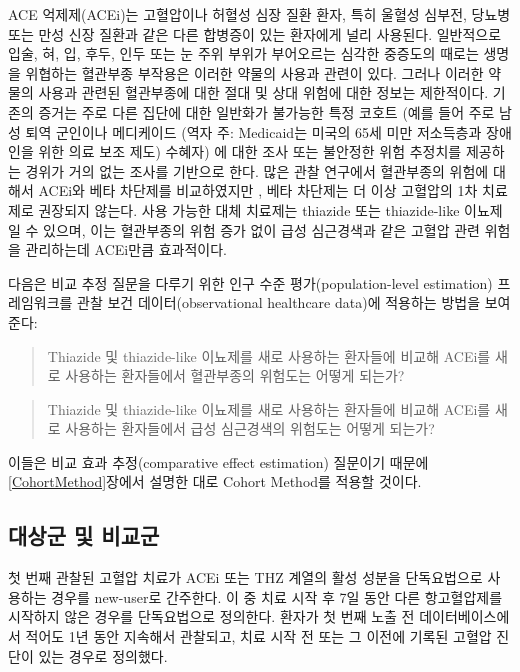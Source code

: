 \documentclass[11pt]{book}
\theoremstyle{definition}
\theoremstyle{definition}
\theoremstyle{definition}
\theoremstyle{remark}
\begin{document}
ACE 억제제(ACEi)는 고혈압이나 허혈성 심장 질환 환자, 특히 울혈성 심부전,
당뇨병 또는 만성 신장 질환과 같은 다른 합병증이 있는 환자에게 널리
사용된다. \citep{zaman_2002} 일반적으로 입술, 혀, 입, 후두, 인두 또는 눈
주위 부위가 부어오르는 심각한 중증도의 때로는 생명을 위협하는 혈관부종
부작용은 이러한 약물의 사용과 관련이 있다. \citep{sabroe_1997} 그러나
이러한 약물의 사용과 관련된 혈관부종에 대한 절대 및 상대 위험에 대한
정보는 제한적이다. 기존의 증거는 주로 다른 집단에 대한 일반화가 불가능한
특정 코호트 (예를 들어 주로 남성 퇴역 군인이나 메디케이드 (역자 주:
Medicaid는 미국의 65세 미만 저소득층과 장애인을 위한 의료 보조 제도)
수혜자) 에 대한 조사 또는 불안정한 위험 추정치를 제공하는 경위가 거의
없는 조사를 기반으로 한다. \citep{powers_2012} 많은 관찰 연구에서
혈관부종의 위험에 대해서 ACEi와 베타 차단제를 비교하였지만
\citep{magid_2010, toh_2012}, 베타 차단제는 더 이상 고혈압의 1차
치료제로 권장되지 않는다. \citep{whelton_2018} 사용 가능한 대체 치료제는
thiazide 또는 thiazide-like 이뇨제일 수 있으며, 이는 혈관부종의 위험
증가 없이 급성 심근경색과 같은 고혈압 관련 위험을 관리하는데 ACEi만큼
효과적이다.

다음은 비교 추정 질문을 다루기 위한 인구 수준 평가(population-level
estimation) 프레임워크를 관찰 보건 데이터(observational healthcare
data)에 적용하는 방법을 보여준다:

\begin{quote}
Thiazide 및 thiazide-like 이뇨제를 새로 사용하는 환자들에 비교해 ACEi를
새로 사용하는 환자들에서 혈관부종의 위험도는 어떻게 되는가?
\end{quote}

\begin{quote}
Thiazide 및 thiazide-like 이뇨제를 새로 사용하는 환자들에 비교해 ACEi를
새로 사용하는 환자들에서 급성 심근경색의 위험도는 어떻게 되는가?
\end{quote}

이들은 비교 효과 추정(comparative effect estimation) 질문이기 때문에
\ref{CohortMethod}장에서 설명한 대로 Cohort Method를 적용할 것이다.

\subsection{대상군 및 비교군}\label{--}

첫 번째 관찰된 고혈압 치료가 ACEi 또는 THZ 계열의 활성 성분을
단독요법으로 사용하는 경우를 new-user로 간주한다. 이 중 치료 시작 후 7일
동안 다른 항고혈압제를 시작하지 않은 경우를 단독요법으로 정의한다.
환자가 첫 번째 노출 전 데이터베이스에서 적어도 1년 동안 지속해서
관찰되고, 치료 시작 전 또는 그 이전에 기록된 고혈압 진단이 있는 경우로
정의했다.
\end{document}
